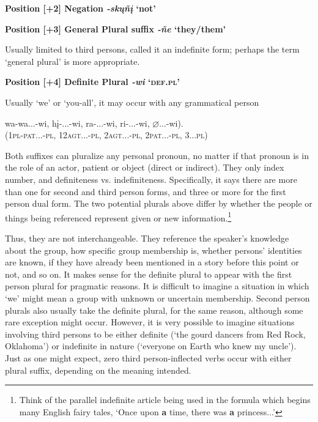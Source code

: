 \documentclass[output=paper]{LSP/langsci}
\begin{document}
\textbf{Position [+2]  Negation  \textit{-sk\k{u}\~n\k{i}}  `not' }	
\vspace{1em}
	   	      						     
\textbf{Position [+3]  General Plural suffix  \textit{-\~ne}  `they/them'} 

Usually limited to third persons, \citet{Whitman1947} called it an indefinite form; perhaps the term `general plural' is more appropriate.  

\vspace{1em}
\textbf{Position [+4] Definite Plural \textit{-wi}  `\textsc{def.pl}'}

 Usually `we' or `you-all', it may occur with any grammatical person  
 \begin{exe} 
 \ex \gll wa-wa...-wi, { }  h\k{i}-...-wi, { }     ra-...-wi, { } ri-...-wi, { } $\varnothing$...-wi).  \\
            (1\textsc{pl}-\textsc{pat}...-\textsc{pl}, { } 12\textsc{agt}...-\textsc{pl}, { }    2\textsc{agt}...-\textsc{pl}, { } 2\textsc{pat}...-\textsc{pl}, { } 3...\textsc{pl})  \\
\end{exe}            

Both suffixes can pluralize any personal pronoun, no matter if that pronoun is in the role of an actor, patient or object (direct or indirect).  They only index number, and definiteness vs. indefiniteness.  Specifically, it says there are more than one for second and third person forms, and three or more for the first person dual form. The two potential plurals above differ by whether the people or things being referenced represent given or new information.\footnote{Think of the parallel indefinite article being used in the formula which begins many English fairy tales, `Once upon \textbf{a} time, there was \textbf{a} princess...'}   

Thus, they are not interchangeable.  They reference the speaker's knowledge about the group, how specific group membership is, whether persons' identities are known, if they have already been mentioned in a story before this point or not, and so on.  It makes sense for the definite plural to appear with the first person plural for pragmatic reasons.  It is difficult to imagine a situation in which `we' might mean a group with unknown or uncertain membership.  Second person plurals also usually take the definite plural, for the same reason, although some rare exception might occur.  However, it is very possible to imagine situations involving third persons to be either definite (`the gourd dancers from Red Rock, Oklahoma') or indefinite in nature (`everyone on Earth who knew my uncle').  Just as one might expect, zero third person-inflected verbs occur with either plural suffix, depending on the meaning intended. 
\end{document}
